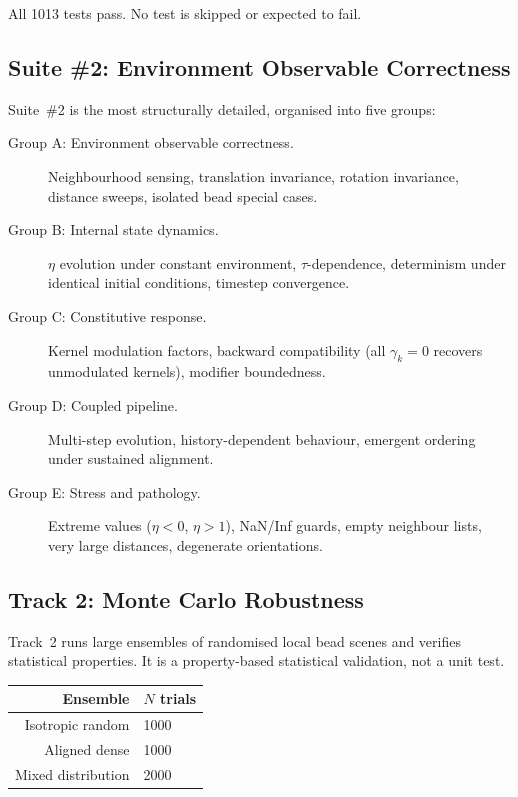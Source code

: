 \documentclass[11pt]{article}
\begin{document}
All 1013 tests pass.  No test is skipped or expected to fail.

\subsection{Suite \#2: Environment Observable Correctness}

Suite~\#2 is the most structurally detailed, organised into five groups:

\begin{description}
    \item[Group A: Environment observable correctness.]
        Neighbourhood sensing, translation invariance, rotation invariance,
        distance sweeps, isolated bead special cases.

    \item[Group B: Internal state dynamics.]
        $\eta$ evolution under constant environment, $\tau$-dependence,
        determinism under identical initial conditions, timestep
        convergence.

    \item[Group C: Constitutive response.]
        Kernel modulation factors, backward compatibility (all $\gamma_k
        = 0$ recovers unmodulated kernels), modifier boundedness.

    \item[Group D: Coupled pipeline.]
        Multi-step evolution, history-dependent behaviour, emergent
        ordering under sustained alignment.

    \item[Group E: Stress and pathology.]
        Extreme values ($\eta < 0$, $\eta > 1$), NaN/Inf guards, empty
        neighbour lists, very large distances, degenerate orientations.
\end{description}

\subsection{Track 2: Monte Carlo Robustness}

Track~2 runs large ensembles of randomised local bead scenes and verifies
statistical properties.  It is a property-based statistical validation,
not a unit test.

\begin{center}
\begin{tabular}{rl}
    \textbf{Ensemble} & \textbf{$N$ trials} \\
    \midrule
    Isotropic random    & 1000 \\
    Aligned dense       & 1000 \\
    Mixed distribution  & 2000 \\
\end{tabular}
\end{center}
\end{document}
